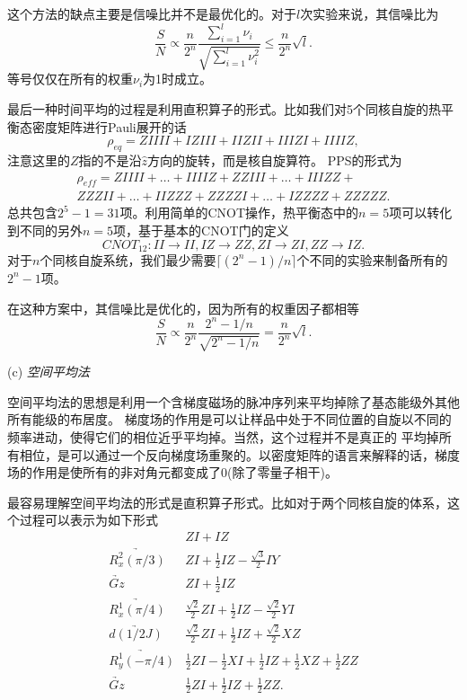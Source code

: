 这个方法的缺点主要是信噪比并不是最优化的。对于$l$次实验来说，其信噪比为
 \begin{equation}\label{aaa}
\frac{S}{N}\propto \frac{n}{2^n}\frac{\sum_{i=1}^l \nu_i}{\sqrt{\sum_{i=1}^l \nu_i^2}} \leq \frac{n}{2^n}\sqrt{l} .
\end{equation}
等号仅仅在所有的权重$\nu_i$为1时成立。

最后一种时间平均的过程是利用直积算子的形式。比如我们对5个同核自旋的热平衡态密度矩阵进行Pauli展开的话
 \begin{equation}\label{aaa}
\rho_{eq} = ZIIII+IZIII+IIZII+IIIZI+IIIIZ,
\end{equation}
注意这里的$Z$指的不是沿$\hat{z}$方向的旋转，而是核自旋算符。
PPS的形式为
 \begin{eqnarray}\label{aaa}
\rho_{eff} = ZIIII+\ldots+IIIIZ + ZZIII+\ldots+IIIZZ+ \nonumber \\
ZZZII+\ldots+IIZZZ+ZZZZI+\ldots+IZZZZ+ZZZZZ.
\end{eqnarray}
总共包含$2^5-1=31$项。利用简单的CNOT操作，热平衡态中的$n=5$项可以转化到不同的另外$n=5$项，基于基本的CNOT门的定义
 \begin{equation}\label{aaa}
CNOT_{12}: II\rightarrow II, IZ \rightarrow ZZ, ZI\rightarrow ZI, ZZ\rightarrow IZ.
\end{equation}
对于$n$个同核自旋系统，我们最少需要$\lceil (2^n-1)/n \rceil$个不同的实验来制备所有的$2^n-1$项。

在这种方案中，其信噪比是优化的，因为所有的权重因子都相等
 \begin{equation}\label{aaa}
\frac{S}{N}\propto \frac{n}{2^n}\frac{2^n-1/n}{\sqrt{2^n-1/n}} = \frac{n}{2^n}\sqrt{l}.
\end{equation}

(c) \emph{空间平均法}

空间平均法\cite{pps6}的思想是利用一个含梯度磁场的脉冲序列来平均掉除了基态能级外其他所有能级的布居度。
梯度场的作用是可以让样品中处于不同位置的自旋以不同的频率进动，使得它们的相位近乎平均掉。当然，这个过程并不是真正的
平均掉所有相位，是可以通过一个反向梯度场重聚的。以密度矩阵的语言来解释的话，梯度场的作用是使所有的非对角元都变成了0(除了零量子相干)。

最容易理解空间平均法的形式是直积算子形式。比如对于两个同核自旋的体系，这个过程可以表示为如下形式
\begin{eqnarray}\label{aaa}
&ZI + IZ \nonumber \\
\underrightarrow{R_x^2(\pi/3)} &ZI + \frac{1}{2}IZ -\frac{\sqrt{3}}{2}IY \nonumber \\
\underrightarrow{Gz} &ZI + \frac{1}{2}IZ  \nonumber \\
\underrightarrow{R_x^1(\pi/4)} & \frac{\sqrt{2}}{2}ZI + \frac{1}{2}IZ -\frac{\sqrt{2}}{2}YI \nonumber \\
\underrightarrow{d(1/2J)} & \frac{\sqrt{2}}{2}ZI + \frac{1}{2}IZ +\frac{\sqrt{2}}{2}XZ \nonumber \\
\underrightarrow{R_y^1(-\pi/4)} & \frac{1}{2}ZI -\frac{1}{2}XI+ \frac{1}{2}IZ + \frac{1}{2}XZ +\frac{1}{2}ZZ\nonumber \\
\underrightarrow{Gz} &\frac{1}{2}ZI + \frac{1}{2}IZ +\frac{1}{2}ZZ.
\end{eqnarray}

